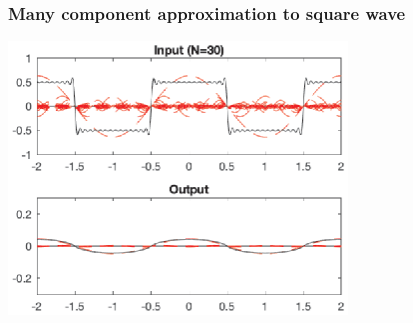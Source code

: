 \documentclass[10pt]{beamer}
\begin{document}
\begin{frame}
  \frametitle{Many component approximation to square wave}
  \begin{center}
    \includegraphics[width=9cm]{fs_rclpf_fig04}
  \end{center}
\end{frame}
\end{document}
